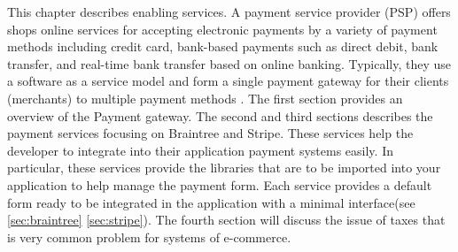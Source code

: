This chapter describes enabling services.
\newline
A payment service provider (PSP) offers shops online services for accepting electronic payments by a variety of payment methods including credit card, bank-based payments such as direct debit, bank transfer, and real-time bank transfer based on online banking. Typically, they use a software as a service model and form a single payment gateway for their clients (merchants) to multiple payment methods \cite{payment_service_provider}.
\newline
The first section provides an overview of the Payment gateway. The second and third sections describes the payment services focusing on Braintree and Stripe.
\newline
These services help the developer to integrate into their application payment systems easily. In particular, these services provide the libraries that are to be imported into your application to help manage the payment form. Each service provides a default form ready to be integrated in the application with a minimal interface(see \ref{sec:braintree} \ref{sec:stripe}).
\newline
The fourth section will discuss the issue of taxes that is very common problem for systems of e-commerce.